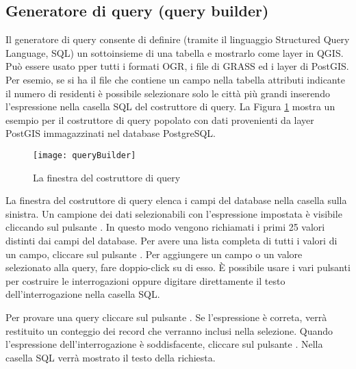 \subsection{Generatore di query (query builder)}\label{sec:query_builder}

Il generatore di query consente di definire (tramite il linguaggio Structured
Query Language, SQL) un sottoinsieme di una tabella e mostrarlo come layer in
QGIS. Può essere usato pper tutti i formati OGR, i file di GRASS ed i layer
di PostGIS. 
Per esemio, se si ha il file  che contiene un campo
 nella tabella attributi indicante il numero di residenti
è possibile selezionare solo le città più grandi inserendo l'espressione
 nella casella SQL del costruttore di query. La
Figura \ref{fig:query_builder} mostra un esempio per il costruttore di query
popolato con dati provenienti da layer PostGIS immagazzinati nel database PostgreSQL. 

\begin{figure}[ht]
  \begin{center}
    \caption{La finestra del costruttore di query \nixcaption}\label{fig:query_builder}\smallskip
    \texttt{[image: queryBuilder]}
  \end{center}  
\end{figure}

La finestra del costruttore di query elenca i campi del
database nella casella sulla sinistra. Un campione dei dati selezionabili con
l'espressione impostata è visibile cliccando sul pulsante  . In questo modo vengono richiamati i primi 25
valori distinti dai campi del database. Per avere una lista completa di tutti
i valori di un campo, cliccare sul pulsante  . Per aggiungere un campo o un valore selezionato alla query, fare
doppio-click su di esso. È possibile usare
i vari pulsanti per costruire le interrogazioni oppure digitare direttamente
il testo dell'interrogazione nella casella SQL.

Per provare una query cliccare sul pulsante 
. Se l'espressione è correta, verrà
restituito un conteggio dei record che verranno inclusi nella selezione.
Quando l'espressione dell'interrogazione è soddisfacente, cliccare sul
pulsante . Nella casella SQL verrà mostrato il testo della richiesta.

